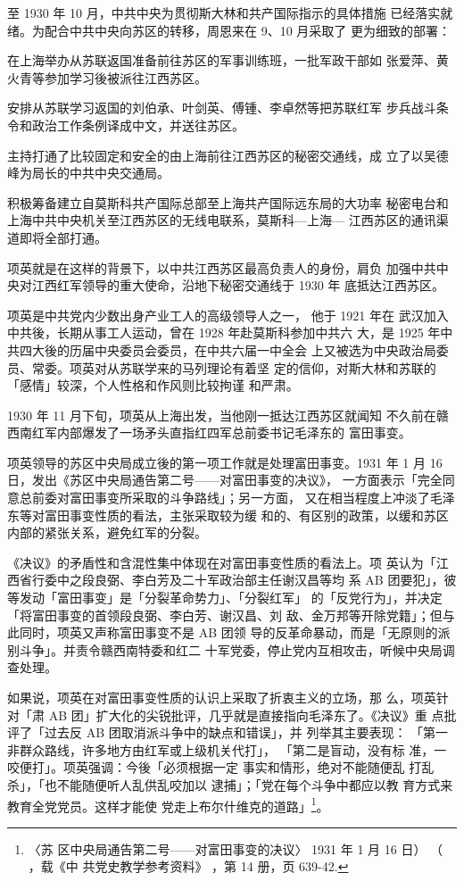 至 1930 年 10 月，中共中央为贯彻斯大林和共产国际指示的具体措施
已经落实就绪。为配合中共中央向苏区的转移，周恩来在 9、10 月采取了
更为细致的部署：

在上海举办从苏联返国准备前往苏区的军事训练班，一批军政干部如
张爱萍、黄火青等参加学习後被派往江西苏区。

安排从苏联学习返国的刘伯承、叶剑英、傅锺、李卓然等把苏联红军
步兵战斗条令和政治工作条例译成中文，并送往苏区。

主持打通了比较固定和安全的由上海前往江西苏区的秘密交通线，成
立了以吴德峰为局长的中共中央交通局。
 
积极筹备建立自莫斯科共产国际总部至上海共产国际远东局的大功率
秘密电台和上海中共中央机关至江西苏区的无线电联系，莫斯科—上海—
江西苏区的通讯渠道即将全部打通。
 
项英就是在这样的背景下，以中共江西苏区最高负责人的身份，肩负
加强中共中央对江西红军领导的重大使命，沿地下秘密交通线于 1930 年
底抵达江西苏区。
 
项英是中共党内少数出身产业工人的高级领导人之一，
他于 1921 年在
武汉加入中共後，长期从事工人运动，曾在 1928 年赴莫斯科参加中共六
大，是 1925 年中共四大後的历届中央委员会委员，在中共六届一中全会
上又被选为中央政治局委员、常委。项英对从苏联学来的马列理论有着坚
定的信仰，对斯大林和苏联的「感情」较深，个人性格和作风则比较拘谨
和严肃。
 
1930 年 11 月下旬，项英从上海出发，当他刚一抵达江西苏区就闻知
不久前在赣西南红军内部爆发了一场矛头直指红四军总前委书记毛泽东的
富田事变。

项英领导的苏区中央局成立後的第一项工作就是处理富田事变。1931
年 1 月 16 日，发出《苏区中央局通告第二号——对富田事变的决议》，
一方面表示「完全同意总前委对富田事变所采取的斗争路线」；另一方面，
又在相当程度上冲淡了毛泽东等对富田事变性质的看法，主张采取较为缓
和的、有区别的政策，以缓和苏区内部的紧张关系，避免红军的分裂。

《决议》的矛盾性和含混性集中体现在对富田事变性质的看法上。项
英认为「江西省行委中之段良弼、李白芳及二十军政治部主任谢汉昌等均
系 AB 团要犯」，彼等发动「富田事变」是「分裂革命势力」、「分裂红军」
的「反党行为」，并决定「将富田事变的首领段良弼、李白芳、谢汉昌、刘
敌、金万邦等开除党籍」；但与此同时，项英又声称富田事变不是 AB 团领
导的反革命暴动，而是「无原则的派别斗争」。并责令赣西南特委和红二
十军党委，停止党内互相攻击，听候中央局调查处理。

如果说，项英在对富田事变性质的认识上采取了折衷主义的立场，那 么，项英针
对「肃 AB 团」扩大化的尖锐批评，几乎就是直接指向毛泽东了。《决议》重
点批评了「过去反 AB 团取消派斗争中的缺点和错误」，并 列举其主要表现：
「第一非群众路线，许多地方由红军或上级机关代打」， 「第二是盲动，没有标
准，一咬便打」。项英强调：今後「必须根据一定 事实和情形，绝对不能随便乱
打乱杀」，「也不能随便听人乱供乱咬加以 逮捕」；「党在每个斗争中都应以教
育方式来教育全党党员。这样才能使 党走上布尔什维克的道路」\footnote{ 〈苏
区中央局通告第二号——对富田事变的决议〉 1931 年 1 月 16 日） （ ，载《中
共党史教学参考资料》 ，第 14 册，页 639-42.}。

